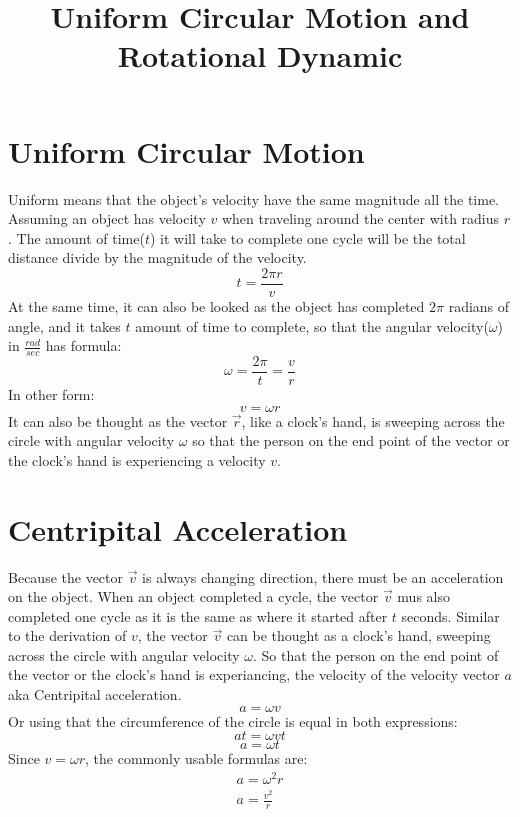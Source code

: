 \documentclass[]{article}
\title{Uniform Circular Motion and Rotational Dynamic}
\author{}
\begin{document}
    \maketitle
    \section{Uniform Circular Motion}\label{sec:uniform-circular-motion}
        Uniform means that the object's velocity have the same magnitude all
        the time. Assuming an object has velocity $v$ when traveling around
        the center with radius $r$. The amount of time($t$) it will take to
        complete one cycle will be the total distance divide by the magnitude of
        the velocity.
            \[t = \frac{2\pi r}{v} \]
        At the same time, it can also be looked as the object has completed $2\pi$ radians of angle,
        and it takes $t$ amount of time to complete, so that the angular
        velocity($\omega$) in $\frac{rad}{sec}$ has formula:
            \[\omega = \frac{2\pi}{t} = \frac{v}{r}\]
        In other form:
            \[v = \omega r\]
        It can also be thought as the vector $\vec{r}$, like a clock's hand, is
        sweeping across the circle with angular velocity $\omega$ so that the
        person on the end point of the vector or the clock's hand is
        experiencing a velocity $v$.
    \section{Centripital Acceleration}\label{sec:centripital-acceleration}
        Because the vector $\vec{v}$ is always changing direction, there
    must be an acceleration on the object. When an object completed a cycle,
    the vector $\vec{v}$ mus also completed one cycle as it is the same as
    where it started after $t$ seconds. Similar to the derivation of $v$, the
    vector $\vec{v}$ can be thought as a clock's hand, sweeping across the circle with
    angular velocity $\omega$. So that the person on the end point of the
    vector or the clock's hand is experiancing, the velocity of the velocity
    vector $a$ aka Centripital acceleration.
    \[a = \omega v\]
    Or using that the circumference of the circle is equal in both expressions:
    \[a t  = \omega v t\]
    \[a = \omega t\]
    Since $v = \omega r $, the commonly usable formulas are:
        \begin{gather*}
            a = \omega ^2 r\\
            a = \frac{v^2}{r}\\
        \end{gather*}
\end{document}
